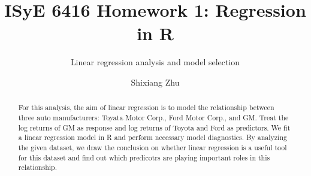 \documentclass[sigconf]{acmart}
\begin{document}
\title{ISyE 6416 Homework 1: Regression in R}
\subtitle{Linear regression analysis and model selection}

\author{Shixiang Zhu}

\begin{abstract}
For this analysis, the aim of linear regression is to model the relationship between three auto manufacturers: Toyata Motor Corp., Ford Motor Corp., and GM. Treat the log returns of GM as response and log returns of Toyota and Ford as predictors. We fit a linear regression model in R and perform necessary model diagnostics. By analyzing the given dataset, we draw the conclusion on whether linear regression is a useful tool for this dataset and find out which predicotrs are playing important roles in this relationship.
\end{abstract}


\maketitle
\newcommand{\norm}[1]{\left\lVert#1\right\rVert}




\end{document}
